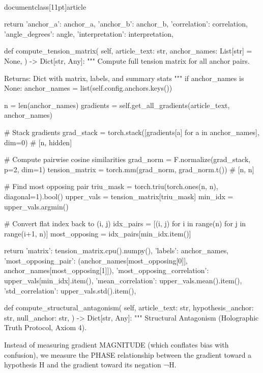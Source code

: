 \\documentclass[11pt]{article}
\begin{document}
\begin{CodeBlock}
        return {
            'anchor_a': anchor_a,
            'anchor_b': anchor_b,
            'correlation': correlation,
            'angle_degrees': angle,
            'interpretation': interpretation,
        }
    
    def compute_tension_matrix(
        self,
        article_text: str,
        anchor_names: List[str] = None,
    ) -> Dict[str, Any]:
        """
        Compute full tension matrix for all anchor pairs.
        
        Returns:
            Dict with matrix, labels, and summary stats
        """
        if anchor_names is None:
            anchor_names = list(self.config.anchors.keys())
        
        n = len(anchor_names)
        gradients = self.get_all_gradients(article_text, anchor_names)
        
        # Stack gradients
        grad_stack = torch.stack([gradients[a] for a in anchor_names], dim=0)  # [n, hidden]
        
        # Compute pairwise cosine similarities
        grad_norm = F.normalize(grad_stack, p=2, dim=1)
        tension_matrix = torch.mm(grad_norm, grad_norm.t())  # [n, n]
        
        # Find most opposing pair
        triu_mask = torch.triu(torch.ones(n, n), diagonal=1).bool()
        upper_vals = tension_matrix[triu_mask]
        min_idx = upper_vals.argmin()
        
        # Convert flat index back to (i, j)
        idx_pairs = [(i, j) for i in range(n) for j in range(i+1, n)]
        most_opposing = idx_pairs[min_idx.item()]
        
        return {
            'matrix': tension_matrix.cpu().numpy(),
            'labels': anchor_names,
            'most_opposing_pair': (anchor_names[most_opposing[0]], anchor_names[most_opposing[1]]),
            'most_opposing_correlation': upper_vals[min_idx].item(),
            'mean_correlation': upper_vals.mean().item(),
            'std_correlation': upper_vals.std().item(),
        }

    def compute_structural_antagonism(
        self,
        article_text: str,
        hypothesis_anchor: str,
        null_anchor: str,
    ) -> Dict[str, Any]:
        """
        Structural Antagonism (Holographic Truth Protocol, Axiom 4).

        Instead of measuring gradient MAGNITUDE (which conflates bias with
        confusion), we measure the PHASE relationship between the gradient
        toward a hypothesis H and the gradient toward its negation ¬H.


\end{CodeBlock}
\end{document}
